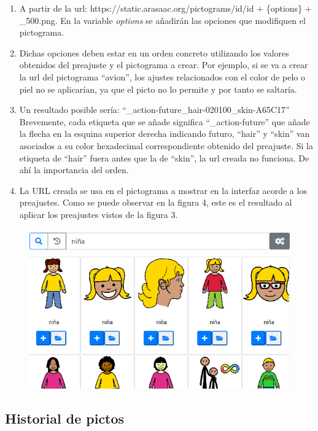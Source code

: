 \begin{enumerate}
	\item A partir de la url: https://static.arasaac.org/pictograms/id/id + \{options\} + \_500.png. En la variable \textit{options} se añadirán las opciones que modifiquen el pictograma.
	
	
	\item Dichas opciones deben estar  en un orden concreto utilizando los valores obtenidos del preajuste y el pictograma a crear. Por ejemplo, si se va a crear la url del  pictograma “avion”, los ajustes relacionados con el color de pelo o piel no se aplicarían, ya que el picto no lo permite y por tanto se saltaría.
	
	\item Un resultado posible sería: “\_action-future\_hair-020100\_skin-A65C17” Brevemente, cada etiqueta que se añade significa “\_action-future” que añade la flecha en la esquina superior derecha indicando futuro, “hair” y “skin” van asociados a su color hexadecimal correspondiente obtenido del preajuste. Si la etiqueta de “hair” fuera antes que la de “skin”, la url creada no funciona. De ahí la importancia del orden.
	
	\item La URL creada se usa en el pictograma a mostrar en la interfaz acorde a los preajustes. Como se puede observar en la figura 4, este es el resultado al aplicar los preajustes vistos de la figura 3.
		
\end{enumerate}

\begin{figure}[h!]
	\centering
	\includegraphics[width=0.7\linewidth]{Imagenes/Bitmap/buscarPictoPreajuste}
	\caption{}
	\label{fig:buscarpictopreajuste}
\end{figure}



\subsection{Historial de pictos}

